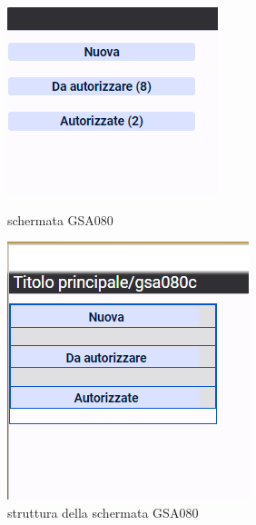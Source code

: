 \documentclass[target=bach,aauheader=,style=]{thud}
\begin{document}
\begin{figure}[h]
    \centering
    \begin{minipage}{0.45\textwidth}
        \centering
        \includegraphics[width=\linewidth]{screenshot/Interfaccia_gsa080.png}
        \caption{schermata GSA080}
    \end{minipage}
    \hfill
    \begin{minipage}{0.45\textwidth}
        \centering
        \includegraphics[width=\linewidth]{screenshot/Struttura_gsa080.png}
        \caption{struttura della schermata GSA080}
    \end{minipage}
\end{figure}
\end{document}
